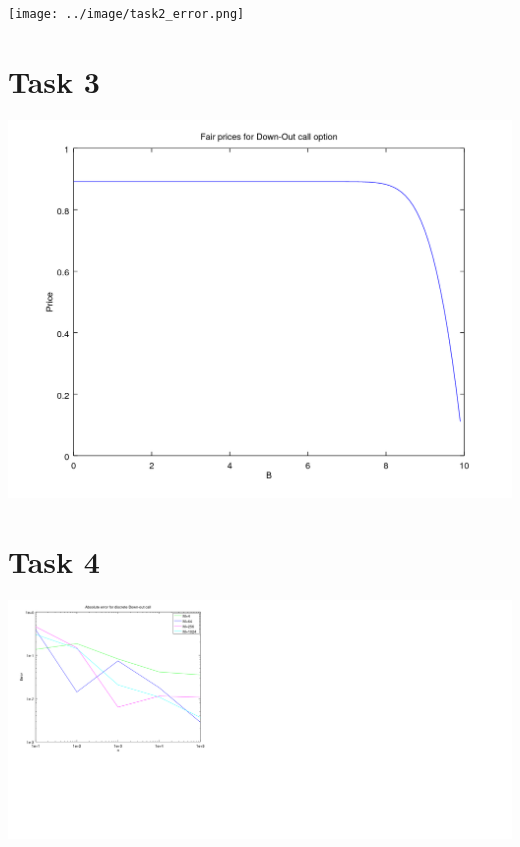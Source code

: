 \documentclass[10pt,a4paper]{article}
\begin{document}
\begin{center}
	\texttt{[image: ../image/task2\_error.png]}
\end{center}

\section*{Task 3}

\begin{center}
	\includegraphics[scale=0.7]{fair_prices_down_out_call.png}
\end{center}

\section*{Task 4}

\begin{center}
	\includegraphics[scale=0.7]{convergence_plot_discrete_down_out_call.png}
\end{center}
\end{document}
